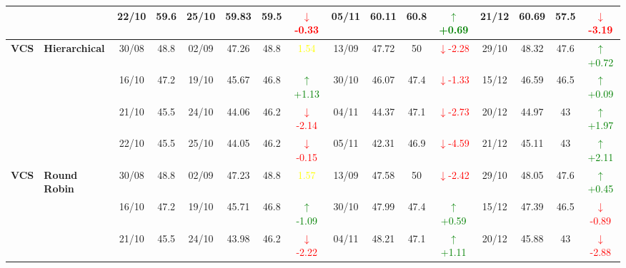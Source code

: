 \documentclass{ieeeaccess}
\begin{document}
{\begin{longtable}{llcc|cccc|cccc|cccc}
&
& 22/10 & 59.6 & 25/10 & 59.83 & 59.5 & \textcolor{red}{\(\downarrow\)-0.33} & 05/11 & 60.11 & 60.8 & \textcolor{green}{\(\uparrow\)+0.69} & 21/12 & 60.69 & 57.5 & \textcolor{red}{\(\downarrow\)-3.19} \\
\midrule



\multirow{4}{*}{\textbf{VCS}} 
& \textbf{Hierarchical}
& 30/08 & 48.8 & 02/09 & 47.26 & 48.8 & \textcolor{yellow}{1.54} & 13/09 & 47.72 & 50 & \textcolor{red}{\(\downarrow\)-2.28} & 29/10 & 48.32 & 47.6 & \textcolor{green}{\(\uparrow\)+0.72} \\

&
& 16/10 & 47.2 & 19/10 & 45.67 & 46.8 & \textcolor{green}{\(\uparrow\)+1.13} & 30/10 & 46.07 & 47.4 & \textcolor{red}{\(\downarrow\)-1.33} & 15/12 & 46.59 & 46.5 & \textcolor{green}{\(\uparrow\)+0.09} \\

&
& 21/10 & 45.5 & 24/10 & 44.06 & 46.2 & \textcolor{red}{\(\downarrow\)-2.14} & 04/11 & 44.37 & 47.1 & \textcolor{red}{\(\downarrow\)-2.73} & 20/12 & 44.97 & 43 & \textcolor{green}{\(\uparrow\)+1.97} \\

&
& 22/10 & 45.5 & 25/10 & 44.05 & 46.2 & \textcolor{red}{\(\downarrow\)-0.15} & 05/11 & 42.31 & 46.9 & \textcolor{red}{\(\downarrow\)-4.59} & 21/12 & 45.11 & 43 & \textcolor{green}{\(\uparrow\)+2.11} \\
\midrule


\multirow{4}{*}{\textbf{VCS}} 
& \textbf{Round Robin}
& 30/08 & 48.8 & 02/09 & 47.23 & 48.8 & \textcolor{yellow}{1.57} & 13/09 & 47.58 & 50 & \textcolor{red}{\(\downarrow\)-2.42} & 29/10 & 48.05 & 47.6 & \textcolor{green}{\(\uparrow\)+0.45} \\

&
& 16/10 & 47.2 & 19/10 & 45.71 & 46.8 & \textcolor{green}{\(\uparrow\)-1.09} & 30/10 & 47.99 & 47.4 & \textcolor{green}{\(\uparrow\)+0.59} & 15/12 & 47.39 & 46.5 & \textcolor{red}{\(\downarrow\)-0.89} \\

&
& 21/10 & 45.5 & 24/10 & 43.98 & 46.2 & \textcolor{red}{\(\downarrow\)-2.22} & 04/11 & 48.21 & 47.1 & \textcolor{green}{\(\uparrow\)+1.11} & 20/12 & 45.88 & 43 & \textcolor{red}{\(\downarrow\)-2.88} \\


\end{longtable}}
\end{document}
